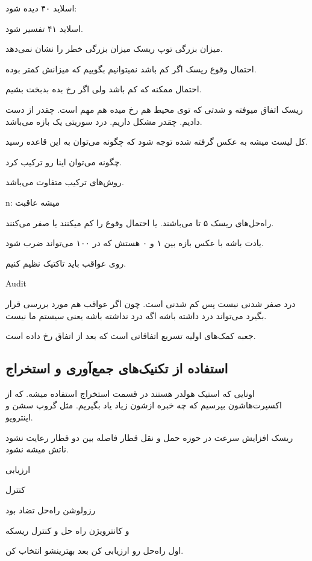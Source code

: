 اسلاید ۴۰ دیده شود:

اسلاید ۴۱ تفسیر شود.

میزان بزرگی توپ ریسک میزان بزرگی خطر را نشان نمی‌دهد.

احتمال وقوع ریسک اگر کم باشد نمیتوانیم بگوییم که میزانش کمتر بوده.

احتمال ممکنه که کم باشد ولی اگر رخ بده بدبخت بشیم.

ریسک اتفاق میوفته و شدتی که توی محیط هم رخ میده هم مهم است. چقدر از دست دادیم.
چقدر مشکل داریم. درد سوریتی یک بازه می‌باشد.

کل لیست میشه  به عکس گرفته شده توجه شود که چگونه می‌توان به این قاعده
رسید.

چگونه می‌توان اینا رو ترکیب کرد.

روش‌های ترکیب متفاوت می‌باشد.

n: میشه عاقبت

راه‌حل‌های ریسک ۵ تا می‌باشند. یا احتمال وقوع را کم میکنند یا صفر می‌کنند.

یادت باشه با عکس بازه بین ۱ و ۰ هستش که در ۱۰۰ می‌تواند ضرب شود.

روی عواقب باید تاکتیک نظیم کنیم.

Audit

درد صفر شدنی نیست پس کم شدنی است. چون اگر عواقب هم مورد بررسی قرار بگیرد
می‌تواند درد داشته باشه اگه درد نداشته باشه یعنی سیستم ما نیست.

جعبه کمک‌های اولیه تسریع اتفاقاتی است که بعد از اتفاق رخ داده است.

\subsection{استفاده از تکنیک‌های جمع‌آوری و استخراج}

اونایی که استیک هولدر هستند در قسمت استخراج استفاده میشه. که از اکسپرت‌هاشون
بپرسیم که چه خبره ازشون زیاد یاد بگیریم. مثل گروپ سشن و اینترویو.

ریسک افزایش سرعت در حوزه حمل و نقل قطار
فاصله بین دو قطار رعایت نشود
ناتش میشه نشود.

ارزیابی

کنترل

رزولوشن راه‌حل تضاد بود

و کانترویژن راه حل و کنترل ریسکه

اول راه‌حل رو ارزیابی کن
بعد بهترینشو انتخاب کن.
